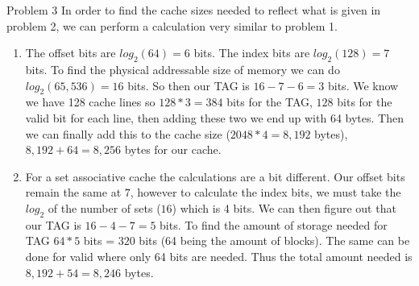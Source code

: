 	\pagebreak
	\begin{problem}{}{Problem 3}
		In order to find the cache sizes needed to reflect what is given in problem 2, we can perform a calculation very similar to problem 1.
		\begin{enumerate}[label=(\alph*)]
			\item  The offset bits are $log_2(64) = 6$ bits. The index bits are $log_2(128) = 7$ bits. To find the physical addressable size of memory we can do $log_2(65,536) = 16$ bits. So then our TAG is $16-7-6 = 3$ bits. We know we have 128 cache lines so $128 * 3 = 384$ bits for the TAG, $128$ bits for the valid bit for each line, then adding these two we end up with 64 bytes.  Then we can finally add this to the cache size ($2048 * 4 = 8,192$ bytes), $8,192 + 64 = 8,256$ bytes for our cache. 
			\item For a set associative cache the calculations are a bit different.  Our offset bits remain the same at $7$, however to calculate the index bits, we must take the $log_2$ of the number of sets ($16$) which is 4 bits. We can then figure out that our TAG is $16-4-7 = 5$ bits. To find the amount of storage needed for TAG $64 * 5$ bits = $320$ bits (64 being the amount of blocks). The same can be done for valid where only 64 bits are needed.  Thus the total amount needed is $8,192 + 54 = 8,246$ bytes. 
		\end{enumerate}
	\end{problem}
	\newpage

